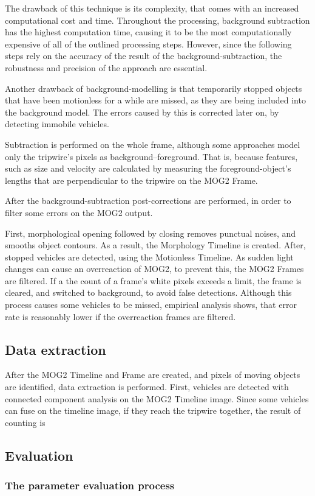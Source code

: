 The drawback of this technique is its complexity, that comes with an increased computational cost and time.
Throughout the processing, background subtraction has the highest computation time, causing it to be the most computationally expensive of all of the outlined processing steps.
However, since the following steps rely on the accuracy of the result of the background-subtraction, the robustness and precision of the approach are essential.

Another drawback of background-modelling is that temporarily stopped objects that have been motionless for a while are missed, as they are being included into the background model.
The errors caused by this is corrected later on, by detecting immobile vehicles.

Subtraction is performed on the whole frame, although some approaches model only the tripwire's pixels as background--foreground.
That is, because features, such as size and velocity are calculated by measuring the foreground-object's lengths that are perpendicular to the tripwire on the MOG2 Frame.

After the background-subtraction post-corrections are performed, in order to filter some errors on the MOG2 output.

First, morphological opening followed by closing removes punctual noises, and smooths object contours.
As a result, the Morphology Timeline is created.
After, stopped vehicles are detected, using the Motionless Timeline.
As sudden light changes can cause an overreaction of MOG2, to prevent this, the MOG2 Frames are filtered.
If a the count of a frame's white pixels exceeds a limit, the frame is cleared, and switched to background, to avoid false detections.
Although this process causes some vehicles to be missed, empirical analysis shows, that error rate is reasonably lower if the overreaction frames are filtered.
\subsection{Data extraction}
After the MOG2 Timeline and Frame are created, and pixels of moving objects are identified, data extraction is performed.
First, vehicles are detected with connected component analysis on the MOG2 Timeline image.
Since some vehicles can fuse on the timeline image, if they reach the tripwire together, the result of counting is
\subsection{Evaluation}
\subsubsection{The parameter evaluation process}




